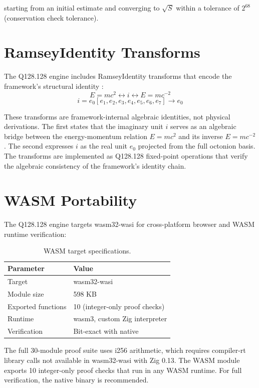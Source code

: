 \documentclass[11pt]{article}
\begin{document}
starting from an initial estimate and converging to $\sqrt{S}$ within a tolerance of $2^{68}$ (conservation check tolerance).

\section{RamseyIdentity Transforms}

The Q128.128 engine includes RamseyIdentity transforms that encode the framework's structural identity \cite{ramsey2026framework}:
\begin{equation}
E = mc^2 \leftrightarrow i \leftrightarrow E = mc^{-2}
\end{equation}
\begin{equation}
i = e_0[e_1, e_2, e_3, e_4, e_5, e_6, e_7] \to e_0
\end{equation}

These transforms are framework-internal algebraic identities, not physical derivations. The first states that the imaginary unit $i$ serves as an algebraic bridge between the energy-momentum relation $E = mc^2$ and its inverse $E = mc^{-2}$. The second expresses $i$ as the real unit $e_0$ projected from the full octonion basis. The transforms are implemented as Q128.128 fixed-point operations that verify the algebraic consistency of the framework's identity chain.

\section{WASM Portability}

The Q128.128 engine targets wasm32-wasi for cross-platform browser and WASM runtime verification:

\begin{table}[ht]
\centering
\caption{WASM target specifications.}
\label{tab:wasm}
\begin{tabular}{ll}
\toprule
Parameter & Value \\
\midrule
Target & wasm32-wasi \\
Module size & 598 KB \\
Exported functions & 10 (integer-only proof checks) \\
Runtime & wasm3, custom Zig interpreter \\
Verification & Bit-exact with native \\
\bottomrule
\end{tabular}
\end{table}

\begin{remark}
The full 30-module proof suite uses i256 arithmetic, which requires compiler-rt library calls not available in wasm32-wasi with Zig 0.13. The WASM module exports 10 integer-only proof checks that run in any WASM runtime. For full verification, the native binary is recommended.
\end{remark}
\end{document}
